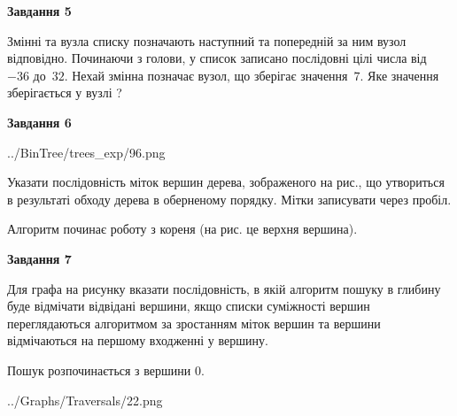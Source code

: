 \documentclass[12pt, ukrainian]{article}
\begin{document}
{\begin {large}
{\begin {center}\textbf{Завдання 5}\end {center}}\par
Змінні  та  вузла списку позначають наступний та попередній за ним вузол відповідно. Починаючи з голови, у список записано послідовні цілі числа від~$-36$ до~$32$. Нехай змінна  позначає вузол, що зберігає значення~$7$.
Яке значення зберігається у вузлі  ?\par
\newpage

{\begin {center}\textbf{Завдання 6}\end {center}}\par

\begin{center}
	{../BinTree/trees_exp/96.png}
\end{center}
Указати послідовність міток вершин дерева, зображеного на рис., що утвориться в результаті обходу дерева в оберненому порядку. Мітки записувати через пробіл.\par Алгоритм починає роботу з кореня (на рис. це верхня вершина).\par
\newpage

{\begin {center}\textbf{Завдання 7}\end {center}}\par
Для графа на рисунку вказати послідовність, в якій алгоритм пошуку в глибину буде відмічати відвідані вершини, якщо списки суміжності вершин переглядаються алгоритмом за зростанням міток вершин та вершини відмічаються на першому вход\-женні у вершину.\par
Пошук розпочинається з вершини 0.\par

\begin{center}
	{../Graphs/Traversals/22.png}
\end{center}\par
\newpage


\end{large}}
\end{document}
